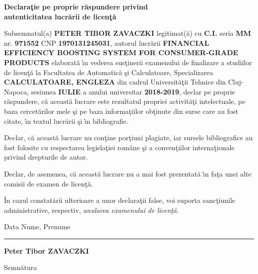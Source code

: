 \documentclass[12pt,a4paper,twoside]{report}
\renewcommand{\thesisauthor}{Peter Tibor ZAVACZKI}    %
\renewcommand{\thesistitle}{FINANCIAL EFFICIENCY BOOSTING SYSTEM FOR CONSUMER-GRADE PRODUCTS}
\newcommand{\uline}[1]{\rule[0pt]{#1}{0.4pt}}
\begin{document}
\vspace{0.5cm}

\begin{center}
  {\bf
    Declara\c{t}ie pe proprie r\u{a}spundere privind\\
    autenticitatea lucr\u{a}rii de licen\c{t}\u{a}}
\end{center}
\vspace{1cm}



Subsemnatul(a) \textbf{PETER TIBOR ZAVACZKI} legitimat(\u{a}) cu \textbf{C.I.} seria \textbf{MM} nr. \textbf{971552} CNP \textbf{1970131245031}, autorul lucr\u{a}rii \textbf{\thesistitle}
elaborat\u{a} \^{\i}n vederea sus\c{t}inerii examenului de finalizare a studiilor de licen\c{t}\u{a} la Facultatea de Automatic\u{a} \c{s}i Calculatoare, Specializarea \textbf{CALCULATOARE, ENGLEZA} din cadrul Universit\u{a}\c{t}ii Tehnice din Cluj-Napoca, sesiunea \textbf{IULIE} a anului universitar \textbf{2018-2019}, declar pe proprie r\u{a}spundere, c\u{a} aceast\u{a} lucrare este rezultatul propriei activit\u{a}\c{t}i intelectuale, pe baza cercet\u{a}rilor mele \c{s}i pe baza informa\c{t}iilor ob\c{t}inute din surse care au fost citate, \^{\i}n textul lucr\u{a}rii \c{s}i \^{\i}n bibliografie.

Declar, c\u{a} aceast\u{a} lucrare nu con\c{t}ine por\c{t}iuni plagiate, iar sursele bibliografice au fost folosite cu
respectarea legisla\c{t}iei rom\^{a}ne \c{s}i a conven\c{t}iilor interna\c{t}ionale privind drepturile de autor.

Declar, de asemenea, c\u{a} aceast\u{a} lucrare nu a mai fost prezentat\u{a} \^{\i}n fa\c{t}a unei alte comisii de examen de licen\c{t}\u{a}.

\^{I}n cazul constat\u{a}rii ulterioare a unor declara\c{t}ii false, voi suporta sanc\c{t}iunile administrative, respectiv, \emph{anularea examenului de licen\c{t}\u{a}}.

\vspace{1.5cm}

Data \hspace{8cm} Nume, Prenume

\vspace{0.5cm}

\uline{3cm} \hspace{5cm} \textbf{\thesisauthor}

\vspace{0.5cm}
\hspace{9.4cm}Semn\u{a}tura

\thispagestyle{empty}
\end{document}
